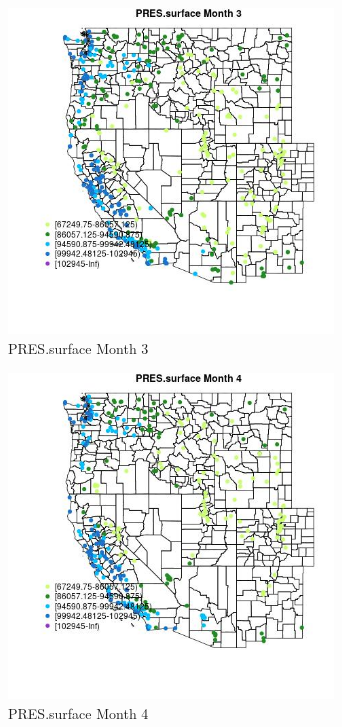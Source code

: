 \begin{figure} 
\centering  
\includegraphics[width=0.77\textwidth]{Code_Outputs/Report_ML_input_PM25_Step4_part_e_de_duplicated_aves_compiled_2019-05-18wNAs_MapObsMo3PRESsurface.jpg} 
\caption{\label{fig:Report_ML_input_PM25_Step4_part_e_de_duplicated_aves_compiled_2019-05-18wNAsMapObsMo3PRESsurface}PRES.surface Month 3} 
\end{figure} 
 

\begin{figure} 
\centering  
\includegraphics[width=0.77\textwidth]{Code_Outputs/Report_ML_input_PM25_Step4_part_e_de_duplicated_aves_compiled_2019-05-18wNAs_MapObsMo4PRESsurface.jpg} 
\caption{\label{fig:Report_ML_input_PM25_Step4_part_e_de_duplicated_aves_compiled_2019-05-18wNAsMapObsMo4PRESsurface}PRES.surface Month 4} 
\end{figure} 
 

